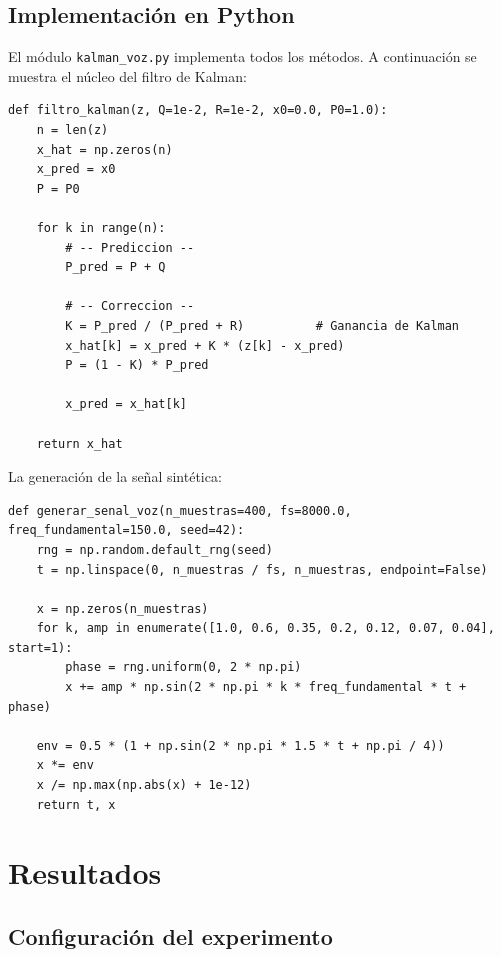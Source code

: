 \documentclass[12pt,a4paper]{article}
\begin{document}
\subsection{Implementación en Python}

El módulo \texttt{kalman\_voz.py} implementa todos los métodos.
A continuación se muestra el núcleo del filtro de Kalman:

\begin{lstlisting}[caption={Filtro de Kalman escalar — \texttt{kalman\_voz.py}}]
def filtro_kalman(z, Q=1e-2, R=1e-2, x0=0.0, P0=1.0):
    n = len(z)
    x_hat = np.zeros(n)
    x_pred = x0
    P = P0

    for k in range(n):
        # -- Prediccion --
        P_pred = P + Q

        # -- Correccion --
        K = P_pred / (P_pred + R)          # Ganancia de Kalman
        x_hat[k] = x_pred + K * (z[k] - x_pred)
        P = (1 - K) * P_pred

        x_pred = x_hat[k]

    return x_hat
\end{lstlisting}

La generación de la señal sintética:

\begin{lstlisting}[caption={Generación de voz sintética — \texttt{kalman\_voz.py}}]
def generar_senal_voz(n_muestras=400, fs=8000.0, freq_fundamental=150.0, seed=42):
    rng = np.random.default_rng(seed)
    t = np.linspace(0, n_muestras / fs, n_muestras, endpoint=False)

    x = np.zeros(n_muestras)
    for k, amp in enumerate([1.0, 0.6, 0.35, 0.2, 0.12, 0.07, 0.04], start=1):
        phase = rng.uniform(0, 2 * np.pi)
        x += amp * np.sin(2 * np.pi * k * freq_fundamental * t + phase)

    env = 0.5 * (1 + np.sin(2 * np.pi * 1.5 * t + np.pi / 4))
    x *= env
    x /= np.max(np.abs(x) + 1e-12)
    return t, x
\end{lstlisting}

\section{Resultados}

\subsection{Configuración del experimento}
\end{document}
